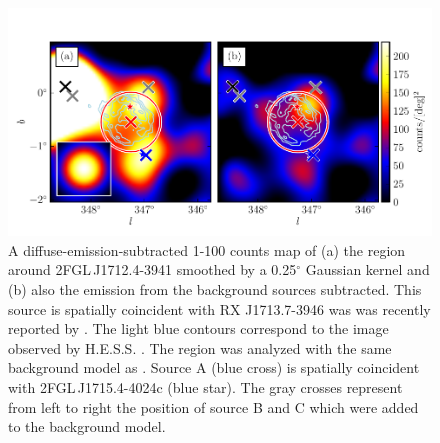 \documentclass[12pt,preprint]{aastex}
\newcommand{\gev}{\text{GeV}\xspace}
\newcommand{\tev}{\text{TeV}\xspace}
\renewcommand{\deg}{\ensuremath{^\circ}\xspace}
\begin{document}
\begin{figure}
  \begin{center}
    \includegraphics[type=pdf,ext=.pdf,read=.pdf]{source_plots/source_RX_J1713.7-3946}
  \end{center}
  \caption{A diffuse-emission-subtracted 1-100 \gev
  counts map of (a) the region around 2FGL\,J1712.4-3941 smoothed by
  a 0.25\deg Gaussian kernel and (b) also the emission 
  from the background sources subtracted.
  This source is spatially
  coincident with RX J1713.7-3946 was was recently reported by
  \citep{rx_j1713_lat}.  The light blue contours correspond to the \tev image
  observed by H.E.S.S. \citep{rx_j1713_hess}.  The region was analyzed
  with the same background model as \citep{rx_j1713_lat}.  Source A (blue
  cross) is spatially coincident with 2FGL\,J1715.4-4024c (blue star).
  The gray crosses represent from left to right the position of source B
  and C which were added to the background model. 
  }\label{2FGL_J1712.4-3941}
\end{figure}
\end{document}
